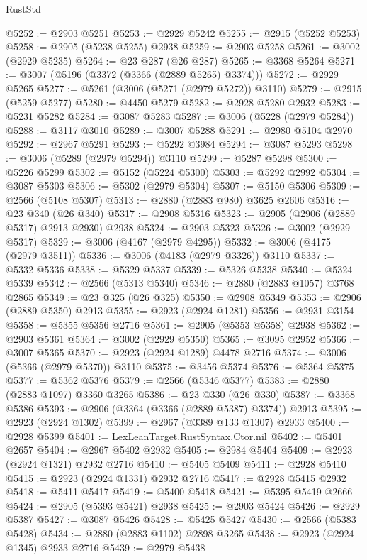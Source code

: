 \begin{lexlean}{RustStd}
\begin{coremodule}
@5252 := @2903 @5251
@5253 := @2929 @5242
@5255 := @2915 (@5252 @5253)
@5258 := @2905 (@5238 @5255) @2938
@5259 := @2903 @5258
@5261 := @3002 (@2929 @5235)
@5264 := @23 @287 (@26 @287)
@5265 := @3368 @5264
@5271 := @3007 (@5196 (@3372 (@3366 (@2889 @5265) @3374)))
@5272 := @2929 @5265
@5277 := @5261 (@3006 (@5271 (@2979 @5272)) @3110)
@5279 := @2915 (@5259 @5277)
@5280 := @4450 @5279
@5282 := @2928 @5280 @2932
@5283 := @5231 @5282
@5284 := @3087 @5283
@5287 := @3006 (@5228 (@2979 @5284))
@5288 := @3117 @3010
@5289 := @3007 @5288
@5291 := @2980 @5104 @2970
@5292 := @2967 @5291
@5293 := @5292 @3984
@5294 := @3087 @5293
@5298 := @3006 (@5289 (@2979 @5294)) @3110
@5299 := @5287 @5298
@5300 := @5226 @5299
@5302 := @5152 (@5224 @5300)
@5303 := @5292 @2992
@5304 := @3087 @5303
@5306 := @5302 (@2979 @5304)
@5307 := @5150 @5306
@5309 := @2566 (@5108 @5307)
@5313 := @2880 (@2883 @980) @3625 @2606
@5316 := @23 @340 (@26 @340)
@5317 := @2908 @5316
@5323 := @2905 (@2906 (@2889 @5317) @2913 @2930) @2938
@5324 := @2903 @5323
@5326 := @3002 (@2929 @5317)
@5329 := @3006 (@4167 (@2979 @4295))
@5332 := @3006 (@4175 (@2979 @3511))
@5336 := @3006 (@4183 (@2979 @3326)) @3110
@5337 := @5332 @5336
@5338 := @5329 @5337
@5339 := @5326 @5338
@5340 := @5324 @5339
@5342 := @2566 (@5313 @5340)
@5346 := @2880 (@2883 @1057) @3768 @2865
@5349 := @23 @325 (@26 @325)
@5350 := @2908 @5349
@5353 := @2906 (@2889 @5350) @2913
@5355 := @2923 (@2924 @1281)
@5356 := @2931 @3154
@5358 := @5355 @5356 @2716
@5361 := @2905 (@5353 @5358) @2938
@5362 := @2903 @5361
@5364 := @3002 (@2929 @5350)
@5365 := @3095 @2952
@5366 := @3007 @5365
@5370 := @2923 (@2924 @1289) @4478 @2716
@5374 := @3006 (@5366 (@2979 @5370)) @3110
@5375 := @3456 @5374
@5376 := @5364 @5375
@5377 := @5362 @5376
@5379 := @2566 (@5346 @5377)
@5383 := @2880 (@2883 @1097) @3360 @3265
@5386 := @23 @330 (@26 @330)
@5387 := @3368 @5386
@5393 := @2906 (@3364 (@3366 (@2889 @5387) @3374)) @2913
@5395 := @2923 (@2924 @1302)
@5399 := @2967 (@3389 @133 @1307) @2933
@5400 := @2928 @5399
@5401 := LexLeanTarget.RustSyntax.Ctor.nil
@5402 := @5401 @2657
@5404 := @2967 @5402 @2932
@5405 := @2984 @5404
@5409 := @2923 (@2924 @1321) @2932 @2716
@5410 := @5405 @5409
@5411 := @2928 @5410
@5415 := @2923 (@2924 @1331) @2932 @2716
@5417 := @2928 @5415 @2932
@5418 := @5411 @5417
@5419 := @5400 @5418
@5421 := @5395 @5419 @2666
@5424 := @2905 (@5393 @5421) @2938
@5425 := @2903 @5424
@5426 := @2929 @5387
@5427 := @3087 @5426
@5428 := @5425 @5427
@5430 := @2566 (@5383 @5428)
@5434 := @2880 (@2883 @1102) @2898 @3265
@5438 := @2923 (@2924 @1345) @2933 @2716
@5439 := @2979 @5438

\end{coremodule}
\end{lexlean}
